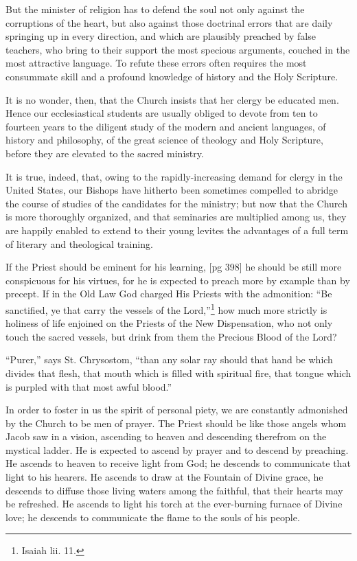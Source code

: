 But the minister of religion has to defend the
soul not only against the corruptions of the heart,
but also against those doctrinal errors that are
daily springing up in every direction, and which
are plausibly preached by false teachers, who
bring to their support the most specious arguments,
couched in the most attractive language.
To refute these errors often requires the most
consummate skill and a profound knowledge of
history and the Holy Scripture.

It is no wonder, then, that the Church insists
that her clergy be educated men. Hence our ecclesiastical
students are usually obliged to devote
from ten to fourteen years to the diligent study of
the modern and ancient languages, of history and
philosophy, of the great science of theology and
Holy Scripture, before they are elevated to the
sacred ministry.

It is true, indeed, that, owing to the rapidly-increasing
demand for clergy in the United States,
our Bishops have hitherto been sometimes compelled
to abridge the course of studies of the candidates
for the ministry; but now that the Church
is more thoroughly organized, and that seminaries
are multiplied among us, they are happily enabled
to extend to their young levites the advantages of
a full term of literary and theological training.

If the Priest should be eminent for his learning,
[pg 398]
he should be still more conspicuous for his virtues,
for he is expected to preach more by example than
by precept. If in the Old Law God charged His
Priests with the admonition: “Be sanctified, ye
that carry the vessels of the Lord,”\footnote{Isaiah lii. 11.} how much
more strictly is holiness of life enjoined on the
Priests of the New Dispensation, who not only
touch the sacred vessels, but drink from them the
Precious Blood of the Lord?

“Purer,” says St. Chrysostom, “than any solar
ray should that hand be which divides that flesh,
that mouth which is filled with spiritual fire, that
tongue which is purpled with that most awful
blood.”

In order to foster in us the spirit of personal
piety, we are constantly admonished by the Church
to be men of prayer. The Priest should be like
those angels whom Jacob saw in a vision, ascending
to heaven and descending therefrom on the
mystical ladder. He is expected to ascend by
prayer and to descend by preaching. He ascends
to heaven to receive light from God; he descends
to communicate that light to his hearers. He
ascends to draw at the Fountain of Divine grace,
he descends to diffuse those living waters among
the faithful, that their hearts may be refreshed.
He ascends to light his torch at the ever-burning
furnace of Divine love; he descends to communicate
the flame to the souls of his people.

